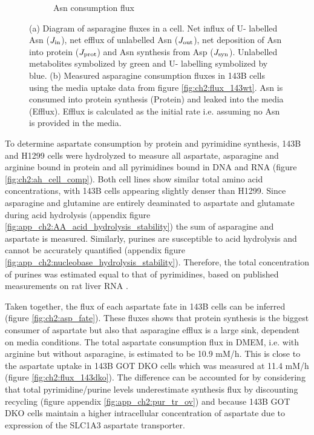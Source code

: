 \begin{figure}[ht]
\begin{subfigure}[b]{0.4\textwidth}
         \caption{Asn consumption flux}
         \label{fig:ch2:Asn_flux}
     \end{subfigure}
     \hspace{0.1\textwidth}
        \caption[Asparagine consumption fluxes.]{
        (a) Diagram of asparagine fluxes in a cell.
        Net influx of U-\hCi{} labelled Asn ($J_{\text{in}}$), net efflux of unlabelled Asn ($J_{\text{out}}$), net deposition of Asn into protein ($J_{\text{prot}}$) and Asn synthesis from Asp ($J_{\text{syn}}$).
        Unlabelled metabolites symbolized by green and U-\hCi{} labelling symbolized by blue.
        (b) Measured asparagine consumption fluxes in 143B cells using the media uptake data from figure \ref{fig:ch2:flux_143wt}.
        Asn is consumed into protein synthesis (Protein) and leaked into the media (Efflux).
        Efflux is calculated as the initial rate i.e. assuming no Asn is provided in the media.
        }
\end{figure}




To determine aspartate consumption by protein and pyrimidine synthesis, 143B and H1299 cells were hydrolyzed to measure all aspartate, asparagine and arginine bound in protein and all pyrimidines bound in DNA and RNA (figure \ref{fig:ch2:ah_cell_comp}).
Both cell lines show similar total amino acid concentrations, with 143B cells appearing slightly denser than H1299.
Since asparagine and glutamine are entirely deaminated to aspartate and glutamate during acid hydrolysis (appendix figure \ref{fig:app_ch2:AA_acid_hydrolysis_stability}) the sum of asparagine and aspartate is measured.
Similarly, purines are susceptible to acid hydrolysis and cannot be accurately quantified (appendix figure \ref{fig:app_ch2:nucleobase_hydrolysis_stability}).
Therefore, the total concentration of purines was estimated equal to that of pyrimidines, based on published measurements on rat liver RNA \cite{Lipshitz1960-jw}.

Taken together, the flux of each aspartate fate in 143B cells can be inferred (figure \ref{fig:ch2:asp_fate}).
These fluxes shows that protein synthesis is the biggest consumer of aspartate but also that asparagine efflux is a large sink, dependent on media conditions.
The total aspartate consumption flux in DMEM, i.e. with arginine but without asparagine, is estimated to be 10.9 mM/h.
This is close to the aspartate uptake in 143B GOT DKO cells which was measured at 11.4 mM/h (figure \ref{fig:ch2:flux_143dko}).
The difference can be accounted for by considering that total pyrimidine/purine levels underestimate synthesis flux by discounting recycling (figure appendix \ref{fig:app_ch2:pur_tr_ov}) and because 143B GOT DKO cells maintain a higher intracellular concentration of aspartate due to expression of the SLC1A3 aspartate transporter.

